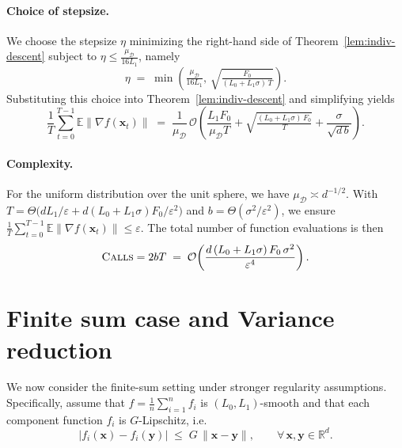 \documentclass[twoside]{article}
\theoremstyle{plain}
\theoremstyle{definition}
\theoremstyle{remark}
\def\vx{{\bm{x}}}
\def\vy{{\bm{y}}}
\newcommand{\R}{\mathbb{R}}
\begin{document}
\paragraph{Choice of stepsize.}
We choose the stepsize $\eta$ minimizing the right-hand side of
Theorem~\ref{lem:indiv-descent} subject to
$\eta \le \tfrac{\mu_{\mathcal{D}}}{16 L_1}$, namely
\begin{equation}
\label{eq:indiv-eta}
\eta
\;=\;
\min\!\left(
    \tfrac{\mu_{\mathcal{D}}}{16 L_1},\,
    \sqrt{\tfrac{F_0}{(L_0+L_1\sigma)\,T}}
\right).
\end{equation}
Substituting this choice into Theorem~\ref{lem:indiv-descent} and simplifying yields
\begin{equation}
\label{eq:indiv-final}
\frac{1}{T}\sum_{t=0}^{T-1} \mathbb{E}\|\nabla f(\vx_t)\|
\;=\;
\frac{1}{\mu_{\mathcal{D}}}\,
\mathcal{O}\!\left(
    \frac{L_1 F_0}{\mu_{\mathcal{D}} T}
    + \sqrt{\tfrac{(L_0+L_1\sigma)\,F_0}{T}}
    + \frac{\sigma}{\sqrt{d\, b}}
\right).
\end{equation}


\paragraph{Complexity.}
For the uniform distribution over the unit sphere, we have
$\mu_{\mathcal{D}}\asymp d^{-1/2}$. With
$T=\Theta\!\big(dL_1/\varepsilon + d(L_0+L_1\sigma)F_0/\varepsilon^2\big)$ and 
$b=\Theta(\sigma^2/\varepsilon^2)$, we ensure
$\frac{1}{T}\sum_{t=0}^{T-1} \mathbb{E}\|\nabla f(\vx_t)\|\le \varepsilon$.
The total number of function evaluations is then
\[
\textsc{Calls}=2bT
\;=\;\mathcal{O}\!\left(\frac{d\,(L_0+L_1\sigma)\,F_0\,\sigma^2}{\varepsilon^4}\right).
\]

      













\color{black}


\section{Finite sum case and Variance reduction}



We now consider the finite-sum setting under stronger regularity assumptions.  
Specifically, assume that $f = \tfrac{1}{n}\sum_{i=1}^n f_i$ is $(L_0,L_1)$-smooth and that each component
function $f_i$ is $G$-Lipschitz, i.e.
\begin{equation}
\label{eq:G-Lipschitz}
    |f_i(\vx) - f_i(\vy)| \;\le\; G\,\|\vx-\vy\|,
    \qquad \forall\, \vx,\vy\in\R^d.
\end{equation}
\end{document}
